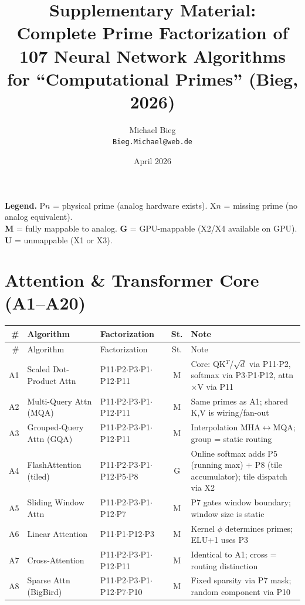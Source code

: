\documentclass[10pt]{article}
\title{Supplementary Material:\\Complete Prime Factorization of 107 Neural Network Algorithms\\for ``Computational Primes'' (Bieg, 2026)}
\author{Michael Bieg\\\texttt{Bieg.Michael@web.de}}
\date{April 2026}
\begin{document}
\maketitle

\noindent\textbf{Legend.} P$n$ = physical prime (analog hardware exists). X$n$ = missing prime (no analog equivalent).\\
\textbf{M} = fully mappable to analog. \textbf{G} = GPU-mappable (X2/X4 available on GPU). \textbf{U} = unmappable (X1 or X3).

\section{Attention \& Transformer Core (A1--A20)}

\begin{longtable}{rlp{3.0cm}cp{4.8cm}}
\toprule
\# & Algorithm & Factorization & St. & Note \\
\midrule
\endfirsthead
\toprule
\# & Algorithm & Factorization & St. & Note \\
\midrule
\endhead
\bottomrule
\endfoot
A1 & Scaled Dot-Product Attn & P11$\cdot$P2$\cdot$P3$\cdot$P1$\cdot$P12$\cdot$P11 & M & Core: QK$^T$/\(\sqrt{d}\) via P11$\cdot$P2, softmax via P3$\cdot$P1$\cdot$P12, attn$\times$V via P11 \\
A2 & Multi-Query Attn (MQA) & P11$\cdot$P2$\cdot$P3$\cdot$P1$\cdot$P12$\cdot$P11 & M & Same primes as A1; shared K,V is wiring/fan-out \\
A3 & Grouped-Query Attn (GQA) & P11$\cdot$P2$\cdot$P3$\cdot$P1$\cdot$P12$\cdot$P11 & M & Interpolation MHA$\leftrightarrow$MQA; group = static routing \\
A4 & FlashAttention (tiled) & P11$\cdot$P2$\cdot$P3$\cdot$P1$\cdot$P12$\cdot$P5$\cdot$P8 & G & Online softmax adds P5 (running max) + P8 (tile accumulator); tile dispatch via X2 \\
A5 & Sliding Window Attn & P11$\cdot$P2$\cdot$P3$\cdot$P1$\cdot$P12$\cdot$P7 & M & P7 gates window boundary; window size is static \\
A6 & Linear Attention & P11$\cdot$P1$\cdot$P12$\cdot$P3 & M & Kernel $\phi$ determines primes; ELU+1 uses P3 \\
A7 & Cross-Attention & P11$\cdot$P2$\cdot$P3$\cdot$P1$\cdot$P12$\cdot$P11 & M & Identical to A1; cross = routing distinction \\
A8 & Sparse Attn (BigBird) & P11$\cdot$P2$\cdot$P3$\cdot$P1$\cdot$P12$\cdot$P7$\cdot$P10 & M & Fixed sparsity via P7 mask; random component via P10 \\

\end{longtable}
\end{document}

